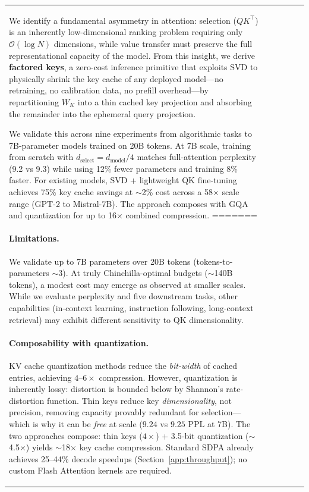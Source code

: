 \documentclass[11pt]{article}
\newcommand{\dmodel}{d_{\text{model}}}
\newcommand{\dselect}{d_{\text{select}}}
\newcommand{\BigO}{\mathcal{O}}
\begin{document}
\begin{table}[h]
\begin{tabular}{lccccc}
We identify a fundamental asymmetry in attention: selection ($QK^\top$) is an inherently low-dimensional ranking problem requiring only $\BigO(\log N)$ dimensions, while value transfer must preserve the full representational capacity of the model. From this insight, we derive \textbf{factored keys}, a zero-cost inference primitive that exploits SVD to physically shrink the key cache of any deployed model---no retraining, no calibration data, no prefill overhead---by repartitioning $W_K$ into a thin cached key projection and absorbing the remainder into the ephemeral query projection.

We validate this across nine experiments from algorithmic tasks to 7B-parameter models trained on 20B tokens. At 7B scale, training from scratch with $\dselect = \dmodel/4$ matches full-attention perplexity (9.2 vs 9.3) while using 12\% fewer parameters and training 8\% faster. For existing models, SVD + lightweight QK fine-tuning achieves 75\% key cache savings at $\sim$2\% cost across a 58$\times$ scale range (GPT-2 to Mistral-7B). The approach composes with GQA and quantization for up to 16$\times$ combined compression.
=======
\paragraph{Limitations.}
We validate up to 7B parameters over 20B tokens (tokens-to-parameters $\sim$3). At truly Chinchilla-optimal budgets ($\sim$140B tokens), a modest cost may emerge as observed at smaller scales. While we evaluate perplexity and five downstream tasks, other capabilities (in-context learning, instruction following, long-context retrieval) may exhibit different sensitivity to QK dimensionality.

\paragraph{Composability with quantization.}
KV cache quantization methods \citep{gao2024rabitq, zandieh2025turboquant, liu2024kivi, zandieh2024qjl} reduce the \emph{bit-width} of cached entries, achieving $4$--$6\times$ compression. However, quantization is inherently lossy: distortion is bounded below by Shannon's rate-distortion function. Thin keys reduce key \emph{dimensionality}, not precision, removing capacity provably redundant for selection---which is why it can be \emph{free} at scale ($9.24$ vs $9.25$ PPL at 7B). The two approaches compose: thin keys ($4\times$) + 3.5-bit quantization ($\sim$4.5$\times$) yields $\sim$18$\times$ key cache compression. Standard SDPA already achieves 25--44\% decode speedups (Section~\ref{app:throughput}); no custom Flash Attention kernels are required.


\end{tabular}
\end{table}
\end{document}
